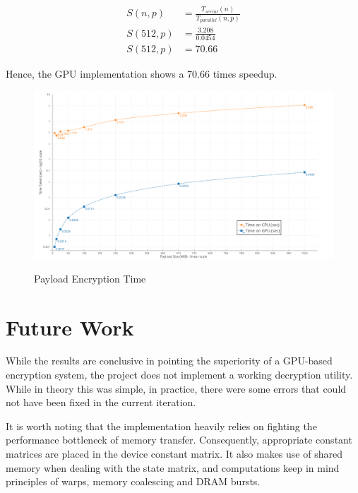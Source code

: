 \documentclass[letterpaper,twocolumn,10pt]{article}
\begin{document}
\begin{align}
    S(n,p) &= \frac{
            T_{serial}(n)
            }{
            T_{parallel}(n,p)
            }
    \\
    S(512, p) &= \frac{
            3.208
            }{
            0.0454
            }
    \\
    S(512, p) &= 70.66
\end{align}

Hence, the GPU implementation shows a 70.66 times speedup.

\begin{figure}
\includegraphics[scale=0.16]{HPC}
\label{Tesla}
\caption{
    Payload Encryption Time
}
\end{figure}

\section{Future Work}
While the results are conclusive in pointing the superiority of a GPU-based encryption system, the project does not implement a working decryption utility. While in theory this was simple, in practice, there were some errors that could not have been fixed in the current iteration.

It is worth noting that the implementation heavily relies on fighting the performance bottleneck of memory transfer. Consequently, appropriate constant matrices are placed in the device constant matrix. It also makes use of shared memory when dealing with the state matrix, and computations keep in mind principles of warps, memory coalescing and DRAM  bursts.
\end{document}
